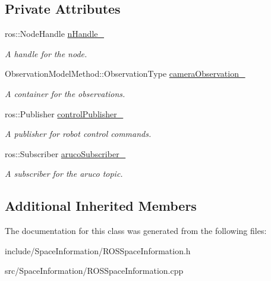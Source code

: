 \subsection*{Private Attributes}
\begin{DoxyCompactItemize}
\item 
\hypertarget{classfirm_1_1_r_o_s_space_information_a1c82bc5b08d4f52bbd4db1195149097a}{ros\-::\-Node\-Handle \hyperlink{classfirm_1_1_r_o_s_space_information_a1c82bc5b08d4f52bbd4db1195149097a}{n\-Handle\-\_\-}}\label{classfirm_1_1_r_o_s_space_information_a1c82bc5b08d4f52bbd4db1195149097a}

\begin{DoxyCompactList}\small\item\em A handle for the node. \end{DoxyCompactList}\item 
\hypertarget{classfirm_1_1_r_o_s_space_information_aeb051c1bfb04da80fb4ab4c25f3b69e8}{Observation\-Model\-Method\-::\-Observation\-Type \hyperlink{classfirm_1_1_r_o_s_space_information_aeb051c1bfb04da80fb4ab4c25f3b69e8}{camera\-Observation\-\_\-}}\label{classfirm_1_1_r_o_s_space_information_aeb051c1bfb04da80fb4ab4c25f3b69e8}

\begin{DoxyCompactList}\small\item\em A container for the observations. \end{DoxyCompactList}\item 
\hypertarget{classfirm_1_1_r_o_s_space_information_a73991a82ee748f847bdf7b9a25971c60}{ros\-::\-Publisher \hyperlink{classfirm_1_1_r_o_s_space_information_a73991a82ee748f847bdf7b9a25971c60}{control\-Publisher\-\_\-}}\label{classfirm_1_1_r_o_s_space_information_a73991a82ee748f847bdf7b9a25971c60}

\begin{DoxyCompactList}\small\item\em A publisher for robot control commands. \end{DoxyCompactList}\item 
\hypertarget{classfirm_1_1_r_o_s_space_information_a468fc746ec28db9aa1cb20ef3f72ef0b}{ros\-::\-Subscriber \hyperlink{classfirm_1_1_r_o_s_space_information_a468fc746ec28db9aa1cb20ef3f72ef0b}{aruco\-Subscriber\-\_\-}}\label{classfirm_1_1_r_o_s_space_information_a468fc746ec28db9aa1cb20ef3f72ef0b}

\begin{DoxyCompactList}\small\item\em A subscriber for the aruco topic. \end{DoxyCompactList}\end{DoxyCompactItemize}
\subsection*{Additional Inherited Members}


The documentation for this class was generated from the following files\-:\begin{DoxyCompactItemize}
\item 
include/\-Space\-Information/R\-O\-S\-Space\-Information.\-h\item 
src/\-Space\-Information/R\-O\-S\-Space\-Information.\-cpp\end{DoxyCompactItemize}
